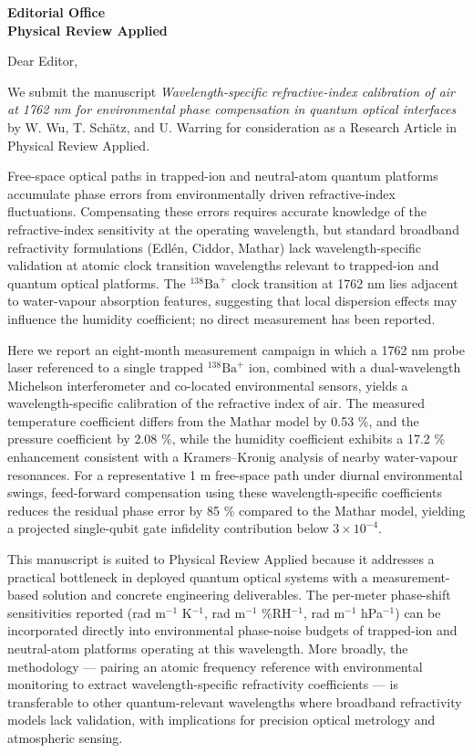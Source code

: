 \documentclass{letter}
\begin{document}
\begin{letter}{\textbf{Editorial Office}\\ 
		\textbf{Physical Review Applied}}

\opening{Dear Editor,}

We submit the manuscript \textit{Wavelength-specific refractive-index calibration of air at 1762 nm for environmental phase compensation in quantum optical interfaces} by W. Wu, T. Sch\"{a}tz, and U. Warring for consideration as a Research Article in Physical Review Applied.

Free-space optical paths in trapped-ion and neutral-atom quantum platforms accumulate phase errors from environmentally driven refractive-index fluctuations. Compensating these errors requires accurate knowledge of the refractive-index sensitivity at the operating wavelength, but standard broadband refractivity formulations (Edlén, Ciddor, Mathar) lack wavelength-specific validation at atomic clock transition wavelengths relevant to trapped-ion and quantum optical platforms. The $^{138}\mathrm{Ba}^+$ clock transition at 1762 nm lies adjacent to water-vapour absorption features, suggesting that local dispersion effects may influence the humidity coefficient; no direct measurement has been reported.

Here we report an eight-month measurement campaign in which a 1762 nm probe laser referenced to a single trapped $^{138}\mathrm{Ba}^+$ ion, combined with a dual-wavelength Michelson interferometer and co-located environmental sensors, yields a wavelength-specific calibration of the refractive index of air. The measured temperature coefficient differs from the Mathar model by 0.53 \%, and the pressure coefficient by 2.08 \%, while the humidity coefficient exhibits a 17.2 \% enhancement consistent with a Kramers–Kronig analysis of nearby water-vapour resonances. For a representative 1 m free-space path under diurnal environmental swings, feed-forward compensation using these wavelength-specific coefficients reduces the residual phase error by 85 \% compared to the Mathar model, yielding a projected single-qubit gate infidelity contribution below $3\times10^{-4}$.

This manuscript is suited to Physical Review Applied because it addresses a practical bottleneck in deployed quantum optical systems with a measurement-based solution and concrete engineering deliverables. The per-meter phase-shift sensitivities reported (rad m$^{-1}$ K$^{-1}$, rad m$^{-1}$ \%RH$^{-1}$, rad m$^{-1}$ hPa$^{-1}$) can be incorporated directly into environmental phase-noise budgets of trapped-ion and neutral-atom platforms operating at this wavelength. More broadly, the methodology — pairing an atomic frequency reference with environmental monitoring to extract wavelength-specific refractivity coefficients — is transferable to other quantum-relevant wavelengths where broadband refractivity models lack validation, with implications for precision optical metrology and atmospheric sensing.


\end{letter}
\end{document}
